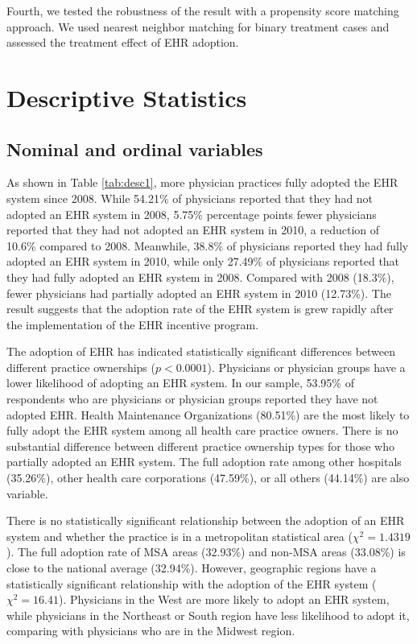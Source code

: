 \documentclass[12pt]{report}
\begin{document}
Fourth, we tested the robustness of the result with a propensity score matching approach. We used nearest neighbor matching for binary treatment cases and assessed the treatment effect of EHR adoption.


\chapter{Descriptive Statistics}

\section{Nominal and ordinal variables}

As shown in Table \ref{tab:desc1}, more physician practices fully adopted the EHR system since 2008. While 54.21\% of physicians reported that they had not adopted an EHR system in 2008, 5.75\% percentage points fewer physicians reported that they had not adopted an EHR system in 2010, a reduction of 10.6\% compared to 2008. Meanwhile, 38.8\% of physicians reported they had fully adopted an EHR system in 2010, while only 27.49\% of physicians reported that they had fully adopted an EHR system in 2008. Compared with 2008 (18.3\%), fewer physicians had partially adopted an EHR system in 2010 (12.73\%). The result suggests that the adoption rate of the EHR system is grew rapidly after the implementation of the EHR incentive program.

The adoption of EHR has indicated statistically significant differences between different practice ownerships ($p<0.0001$). Physicians or physician groups have a lower likelihood of adopting an EHR system. In our sample, 53.95\% of respondents who are physicians or physician groups reported they have not adopted EHR. Health Maintenance Organizations (80.51\%) are the most likely to fully adopt the EHR system among all health care practice owners. There is no substantial difference between different practice ownership types for those who partially adopted an EHR system. The full adoption rate among other hospitals (35.26\%), other health care corporations (47.59\%), or all others (44.14\%) are also variable. 

There is no statistically significant relationship between the adoption of an EHR system and whether the practice is in a metropolitan statistical area ($\chi^2=1.4319$). The full adoption rate of MSA areas (32.93\%) and non-MSA areas (33.08\%) is close to the national average (32.94\%). However, geographic regions have a statistically significant relationship with the adoption of the EHR system ($\chi^2=16.41$). Physicians in the West are more likely to adopt an EHR system, while physicians in the Northeast or South region have less likelihood to adopt it, comparing with physicians who are in the Midwest region.
\end{document}
